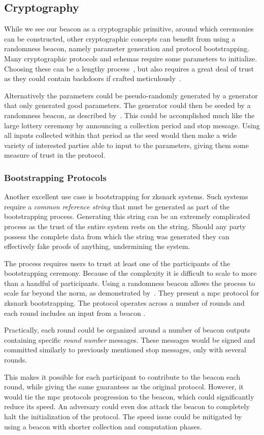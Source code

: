 \subsection{Cryptography}
While we see our beacon as a cryptographic primitive, around which ceremonies can be constructed, other cryptographic concepts can benefit from using a randomness beacon, namely parameter generation and protocol bootstrapping.
Many cryptographic protocols and schemas require some parameters to initialize.
Choosing these can be a lengthy process~\cite{mpcsnarks}, but also requires a great deal of trust as they could contain backdoors if crafted meticulously~\cite{nist2014backdoor}.

Alternatively the parameters could be pseudo-randomly generated by a generator that only generated good parameters.
The generator could then be seeded by a randomness beacon, as described by~\citet{baigneres2015trap}.
This could be accomplished much like the large lottery ceremony by announcing a collection period and stop message.
Using all inputs collected within that period as the seed would then make a wide variety of interested parties able to input to the parameters, giving them some measure of trust in the protocol.

\subsubsection{Bootstrapping Protocols}%
\label{ssub:bootstrapping_protocols}
Another excellent use case is bootstrapping for \gls{zksnark} systems.
Such systems require a \emph{common reference string} that must be generated as part of the bootstrapping process.
Generating this string can be an extremely complicated process as the trust of the entire system rests on the string.
Should any party possess the complete data from which the string was generated they can effectively fake proofs of anything, undermining the system.

The process requires users to trust at least one of the participants of the bootstrapping ceremony. Because of the complexity it is difficult to scale to more than a handful of participants.
Using a randomness beacon allows the process to scale far beyond the norm, as demonstrated by~\citet{mpcsnarks}.
They present a \acrshort{mpc} protocol for \acrshort{zksnark} bootstrapping.
The protocol operates across a number of rounds and each round includes an input from a beacon .

Practically, each round could be organized around a number of beacon outputs containing specific \textit{round number} messages.
These messages would be signed and committed similarly to previously mentioned stop messages, only with several rounds.

This makes it possible for each participant to contribute to the beacon each round, while giving the same guarantees as the original protocol.
However, it would tie the \acrshort{mpc} protocols progression to the beacon, which could significantly reduce its speed.
An adversary could even \acrshort{dos} attack the beacon to completely halt the initialization of the protocol.
The speed issue could be mitigated by using a beacon with shorter collection and computation phases.
